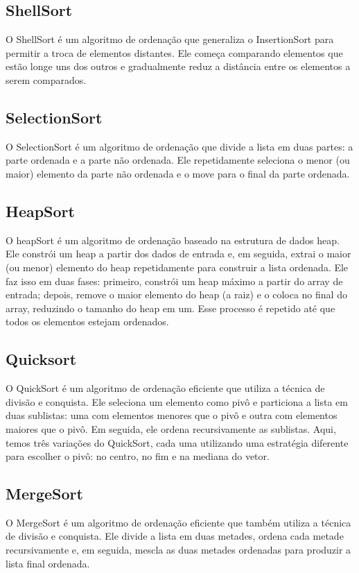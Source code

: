 \documentclass[a4paper, 12pt]{article} %
\begin{document}
\subsection{ShellSort}
O ShellSort é um algoritmo de ordenação que generaliza o InsertionSort para permitir a troca de elementos distantes. Ele começa comparando elementos que estão longe uns dos outros e gradualmente reduz a distância entre os elementos a serem comparados.

\subsection{SelectionSort}
O SelectionSort é um algoritmo de ordenação que divide a lista em duas partes: a parte ordenada e a parte não ordenada. Ele repetidamente seleciona o menor (ou maior) elemento da parte não ordenada e o move para o final da parte ordenada.

\subsection{HeapSort}
O heapSort é um algoritmo de ordenação baseado na estrutura de dados heap. 
Ele constrói um heap a partir dos dados de entrada e, em seguida, extrai o maior (ou menor) elemento do heap repetidamente 
para construir a lista ordenada.
Ele faz isso em duas fases: primeiro, constrói um heap máximo a partir do array de entrada; depois, remove o maior elemento do heap (a raiz) e o coloca no final do array,
reduzindo o tamanho do heap em um. Esse processo é repetido até que todos os elementos estejam ordenados.

\subsection{Quicksort}
O QuickSort é um algoritmo de ordenação eficiente que utiliza a técnica de divisão e conquista. Ele seleciona um elemento como pivô e particiona a lista em duas sublistas:
uma com elementos menores que o pivô e outra com elementos maiores que o pivô. Em seguida, ele ordena recursivamente as sublistas.
Aqui, temos três variações do QuickSort, cada uma utilizando uma estratégia diferente para escolher o pivô: no centro, no fim e na mediana do vetor.

\subsection{MergeSort}
O MergeSort é um algoritmo de ordenação eficiente que também utiliza a técnica de divisão e conquista. 
Ele divide a lista em duas metades, ordena cada metade recursivamente e, em seguida, mescla as duas metades 
ordenadas para produzir a lista final ordenada.
\end{document}
